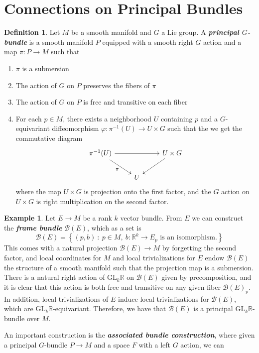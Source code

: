 \documentclass[psamsfonts, 12pt]{amsart}
\theoremstyle{definition}
\newtheorem{defn}[thm]{Definition}
\newtheorem{exmp}[thm]{Example}
\theoremstyle{remark}
\newcommand{\R}{\mathbb{R}}
\newcommand{\ib}[1]{\textbf{\textit{#1}}}
\newcommand{\GL}{\mathrm{GL}}
\newcommand{\inv}{^{-1}}
\newcommand{\set}[1]{\left\lbrace #1 \right\rbrace}
\begin{document}
\section{Connections on Principal Bundles}
%
\begin{defn}
Let $M$ be a smooth manifold and $G$ a Lie group. A \ib{principal $G$-bundle} is a
smooth manifold $P$ equipped with a smooth right $G$ action and a map $\pi : P \to M$ such
that
\begin{enumerate}
  \item $\pi$ is a submersion
  \item The action of $G$ on $P$ preserves the fibers of $\pi$
  \item The action of $G$ on $P$ is free and transitive on each fiber
  \item For each $p \in M$, there exists a neighborhood $U$ containing $p$
  and a $G$-equivariant diffeomorphism $\varphi : \pi\inv(U) \to U \times G$
  such that the we get the commutative diagram
  \[\begin{tikzcd}
  \pi\inv(U) \ar[dr, "\pi"']\ar[rr] && U \times G \ar[dl] \\
  & U
  \end{tikzcd}\]
  where the map $U \times G$ is projection onto the first factor, and the
  $G$ action on $U \times G$ is right multiplication on the second factor.
\end{enumerate}
\end{defn}
%
\begin{exmp}
Let $E \to M$ be a rank $k$ vector bundle. From $E$ we can construct the \ib{frame bundle}
$\mathcal{B}(E)$, which as a set is
\[
\mathcal{B}(E) = \set{(p,b) ~:~ p \in M,~ b : \R^k \to E_p \text{ is an isomorphism.}}
\]
This comes with a natural projection $\mathcal{B}(E) \to M$ by forgetting the
second factor, and local coordinates for $M$ and local trivializations for $E$ endow
$\mathcal{B}(E)$ the structure of a smooth manifold such that the projection
map is a submersion. There is a natural right action of $\GL_k\R$ on $\mathcal{B}(E)$
given by precomposition, and it is clear that this action is both free and transitive
on any given fiber $\mathcal{B}(E)_p$. In addition, local trivializations of $E$
induce local trivializations for $\mathcal{B}(E)$, which are $\GL_k\R$-equivariant.
Therefore, we have that $\mathcal{B}(E)$ is a principal $\GL_k\R$-bundle over
$M$.
\end{exmp}
%
An important construction is the \ib{associated bundle construction}, where given
a principal $G$-bundle $P \to M$ and a space $F$ with a left $G$ action, we can
\end{document}
